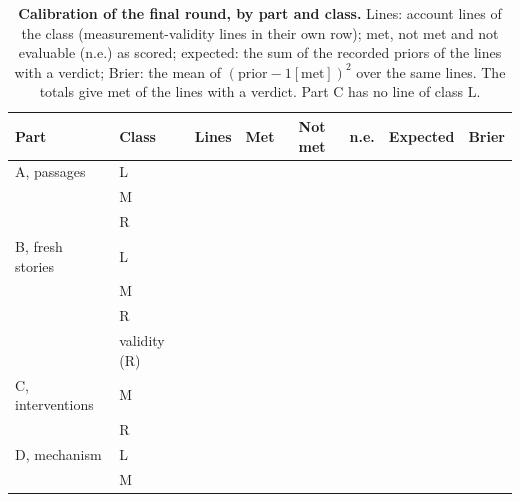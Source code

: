 \begin{table}[!ht]
\centering
\footnotesize
\caption{\textbf{Calibration of the final round, by part and class.} Lines: account lines of the class (measurement-validity lines in their own row); met, not met and not evaluable (n.e.) as scored; expected: the sum of the recorded priors of the lines with a verdict; Brier: the mean of $(\text{prior} - 1[\text{met}])^2$ over the same lines. The totals give met of the lines with a verdict. Part C has no line of class L.}
\label{tab:calibration-j}
\setlength{\tabcolsep}{5pt}
\begin{tabular}{@{}llcccccc@{}}
\toprule
Part & Class & Lines & Met & Not met & n.e. & Expected & Brier \\
\midrule
A, passages & L & \JaClassLLines{} & \JaClassLMet{} & \JaClassLNotMet{} & \JaClassLNotEval{} & \JaClassLExp{} & \JaClassLBrier{} \\
 & M & \JaClassMLines{} & \JaClassMMet{} & \JaClassMNotMet{} & \JaClassMNotEval{} & \JaClassMExp{} & \JaClassMBrier{} \\
 & R & \JaClassRLines{} & \JaClassRMet{} & \JaClassRNotMet{} & \JaClassRNotEval{} & \JaClassRExp{} & \JaClassRBrier{} \\
\addlinespace[2pt]
B, fresh stories & L & \JbClassLLines{} & \JbClassLMet{} & \JbClassLNotMet{} & \JbClassLNotEval{} & \JbClassLExp{} & \JbClassLBrier{} \\
 & M & \JbClassMLines{} & \JbClassMMet{} & \JbClassMNotMet{} & \JbClassMNotEval{} & \JbClassMExp{} & \JbClassMBrier{} \\
 & R & \JbClassRLines{} & \JbClassRMet{} & \JbClassRNotMet{} & \JbClassRNotEval{} & \JbClassRExp{} & \JbClassRBrier{} \\
 & validity (R) & \JbClassValLines{} & \JbClassValMet{} & \JbClassValNotMet{} & \JbClassValNotEval{} & \JbClassValExp{} & \JbClassValBrier{} \\
\addlinespace[2pt]
C, interventions & M & \JcClassMLines{} & \JcClassMMet{} & \JcClassMNotMet{} & \JcClassMNotEval{} & \JcClassMExp{} & \JcClassMBrier{} \\
 & R & \JcClassRLines{} & \JcClassRMet{} & \JcClassRNotMet{} & \JcClassRNotEval{} & \JcClassRExp{} & \JcClassRBrier{} \\
\addlinespace[2pt]
D, mechanism & L & \JdClassLLines{} & \JdClassLMet{} & \JdClassLNotMet{} & \JdClassLNotEval{} & \JdClassLExp{} & \JdClassLBrier{} \\
 & M & \JdClassMLines{} & \JdClassMMet{} & \JdClassMNotMet{} & \JdClassMNotEval{} & \JdClassMExp{} & \JdClassMBrier{} \\

\end{tabular}
\end{table}
